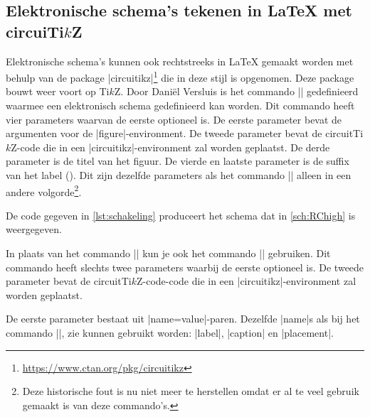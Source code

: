 \subsection{Elektronische schema's tekenen in \LaTeX{} met \texorpdfstring{circuiTi\boldmath$k$Z}{circuiTikZ}}
Elektronische schema's kunnen ook rechtstreeks in \LaTeX{} gemaakt worden met behulp van de package |circuitikz|\footnote{\url{https://www.ctan.org/pkg/circuitikz}} die in deze stijl is opgenomen.
Deze package bouwt weer voort op Ti$k$Z.
Door Daniël Versluis is het commando |\schakeling| gedefinieerd waarmee een elektronisch schema gedefinieerd kan worden.
Dit commando heeft vier parameters waarvan de eerste optioneel is.
De eerste parameter bevat de  argumenten voor de |figure|-environment.
De tweede parameter bevat de circuitTi$k$Z-code die in een |circuitikz|-environment zal worden geplaatst. 
De derde parameter is de titel van het figuur.
De vierde en laatste parameter is de suffix van het label ({\lstllabel{}}).
Dit zijn dezelfde parameters als het commando |\tikzinlinefiguur| alleen in een andere volgorde\footnote{%
	Deze historische fout is nu niet meer te herstellen omdat er al te veel gebruik gemaakt is van deze commando's. 
}.

De code gegeven in \cref{lst:schakeling} produceert het schema dat in \cref{sch:RChigh} is weergegeven.



In plaats van het commando |\schakeling| kun je ook het commando |\hrschakeling| gebruiken.
Dit commando heeft slechts twee parameters waarbij de eerste optioneel is. 
De tweede parameter bevat de circuitTi$k$Z-code-code die in een |circuitikz|-environment zal worden geplaatst.

De eerste parameter bestaat uit |name=value|-paren.
Dezelfde |name|s als bij het commando |\hrtikzfiguur|, zie  kunnen gebruikt worden: |label|, |caption| en |placement|.

